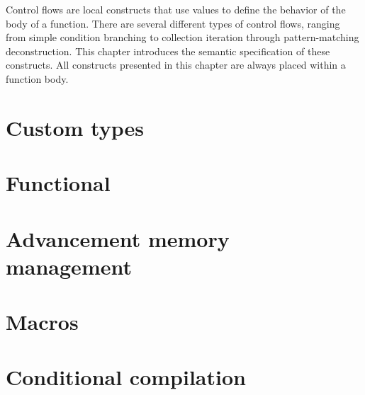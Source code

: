\documentclass[a4paper,11pt]{book}
\begin{document}
Control flows are local constructs that use values to define the behavior of the
body of a function. There are several different types of control flows, ranging
from simple condition branching to collection iteration through pattern-matching
deconstruction. This chapter introduces the semantic specification of these
constructs. All constructs presented in this chapter are always placed within a
function body.

\begin{multicols*}{2}
  \minitoc%
  
\end{multicols*}

\chapter{Custom types}%
\label{chap:custom_types}

\begin{multicols*}{2}
  \minitoc%
  
\end{multicols*}

\chapter{Functional}
\label{chap:functional}

\begin{multicols*}{2}
  \minitoc%
  
\end{multicols*}

\chapter{Advancement memory management}%
\label{chap:memory_management}

\begin{multicols*}{2}
  \minitoc%
\end{multicols*}



\chapter{Macros}
\label{chap:macros}

\begin{multicols*}{2}
  \minitoc%
\end{multicols*}


\chapter{Conditional compilation}
\label{chap:conditional_compilation}

\begin{multicols*}{2}
  \minitoc%
\end{multicols*}
\end{document}
